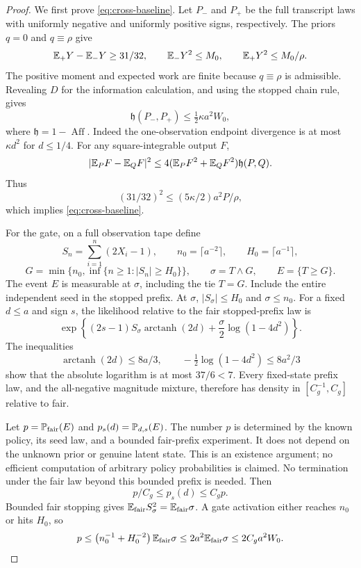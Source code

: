 \begin{proof}
We first prove \eqref{eq:cross-baseline}.  Let \(P_-\) and \(P_+\) be
the full transcript laws with uniformly negative and uniformly positive
signs, respectively.  The priors \(q=0\) and \(q\equiv\rho\) give
\[
 \mathbb E_+Y-\mathbb E_-Y\ge31/32,\qquad
 \mathbb E_-Y^2\le M_0,\qquad \mathbb E_+Y^2\le M_0/\rho.
\]
The positive moment and expected work are finite because \(q\equiv\rho\)
is admissible.  Revealing \(D\) for the information calculation, and
using the stopped chain rule, gives
\[
 \mathfrak h(P_-,P_+)\le\tfrac12\kappa a^2W_0,
\]
where \(\mathfrak h=1-\operatorname{Aff}\).
Indeed the one-observation endpoint divergence is at most
\(\kappa d^2\) for \(d\le1/4\).
For any square-integrable output \(F\),
\begin{equation}
 |\mathbb E_PF-\mathbb E_QF|^2
 \le4(\mathbb E_PF^2+\mathbb E_QF^2)\mathfrak h(P,Q).
 \label{eq:cross-hellinger-moment}
\end{equation}
Thus
\[
 (31/32)^2
 \le(5\kappa/2)a^2P/\rho,
\]
which implies \eqref{eq:cross-baseline}.

For the gate, on a full observation tape define
\[
 S_n=\sum_{i=1}^n(2X_i-1),\qquad
 n_0=\lceil a^{-2}\rceil,\qquad H_0=\lceil a^{-1}\rceil,
\]
\begin{equation}
 G=\min\{n_0,\inf\{n\ge1:|S_n|\ge H_0\}\},\qquad
 \sigma=T\wedge G,\qquad E=\{T\ge G\}.
 \label{eq:cross-gate}
\end{equation}
The event \(E\) is measurable at \(\sigma\), including the tie \(T=G\).
Include the entire independent seed in the stopped prefix.
At \(\sigma\), \(|S_\sigma|\le H_0\) and \(\sigma\le n_0\).
For a fixed \(d\le a\) and sign \(s\), the likelihood relative to the
fair stopped-prefix law is
\[
 \exp\left\{(2s-1)S_\sigma\operatorname{arctanh}(2d)
       +\frac{\sigma}{2}\log(1-4d^2)\right\}.
\]
The inequalities
\[
 \operatorname{arctanh}(2d)\le8a/3,\qquad
 -\tfrac12\log(1-4d^2)\le8a^2/3
\]
show that the absolute logarithm is at most \(37/6<7\).
Every fixed-state prefix law, and the all-negative magnitude mixture,
therefore has density in \([C_g^{-1},C_g]\) relative to fair.

Let \(p=\mathbb P_{\rm fair}(E)\) and \(p_s(d)=\mathbb P_{d,s}(E)\).
The number $p$ is determined by the known policy, its seed law, and a
bounded fair-prefix experiment. It does not depend on the unknown prior
or genuine latent state. This is an existence argument; no efficient
computation of arbitrary policy probabilities is claimed. No termination
under the fair law beyond this bounded prefix is needed. Then
\begin{equation}
 p/C_g\le p_s(d)\le C_gp.
 \label{eq:cross-gate-probabilities}
\end{equation}
Bounded fair stopping gives
\(\mathbb E_{\rm fair}S_\sigma^2=\mathbb E_{\rm fair}\sigma\).
A gate activation either reaches \(n_0\) or hits \(H_0\), so
\begin{equation}
 p\le\left(n_0^{-1}+H_0^{-2}\right)\mathbb E_{\rm fair}\sigma
 \le2a^2\mathbb E_{\rm fair}\sigma
 \le2C_ga^2W_0.
 \label{eq:cross-gate-cost}
\end{equation}


\end{proof}
